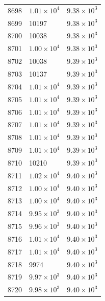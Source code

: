 \begin{table}[H]
\begin{tabular}{lll}
8698 & $\displaystyle 1.01 \times 10^{4}$ & $\displaystyle 9.38 \times 10^{3}$ \\
8699 & 10197 & $\displaystyle 9.38 \times 10^{3}$ \\
8700 & 10038 & $\displaystyle 9.38 \times 10^{3}$ \\
8701 & $\displaystyle 1.00 \times 10^{4}$ & $\displaystyle 9.38 \times 10^{3}$ \\
8702 & 10038 & $\displaystyle 9.39 \times 10^{3}$ \\
8703 & 10137 & $\displaystyle 9.39 \times 10^{3}$ \\
8704 & $\displaystyle 1.01 \times 10^{4}$ & $\displaystyle 9.39 \times 10^{3}$ \\
8705 & $\displaystyle 1.01 \times 10^{4}$ & $\displaystyle 9.39 \times 10^{3}$ \\
8706 & $\displaystyle 1.01 \times 10^{4}$ & $\displaystyle 9.39 \times 10^{3}$ \\
8707 & $\displaystyle 1.01 \times 10^{4}$ & $\displaystyle 9.39 \times 10^{3}$ \\
8708 & $\displaystyle 1.01 \times 10^{4}$ & $\displaystyle 9.39 \times 10^{3}$ \\
8709 & $\displaystyle 1.01 \times 10^{4}$ & $\displaystyle 9.39 \times 10^{3}$ \\
8710 & 10210 & $\displaystyle 9.39 \times 10^{3}$ \\
8711 & $\displaystyle 1.02 \times 10^{4}$ & $\displaystyle 9.40 \times 10^{3}$ \\
8712 & $\displaystyle 1.00 \times 10^{4}$ & $\displaystyle 9.40 \times 10^{3}$ \\
8713 & $\displaystyle 1.00 \times 10^{4}$ & $\displaystyle 9.40 \times 10^{3}$ \\
8714 & $\displaystyle 9.95 \times 10^{3}$ & $\displaystyle 9.40 \times 10^{3}$ \\
8715 & $\displaystyle 9.96 \times 10^{3}$ & $\displaystyle 9.40 \times 10^{3}$ \\
8716 & $\displaystyle 1.01 \times 10^{4}$ & $\displaystyle 9.40 \times 10^{3}$ \\
8717 & $\displaystyle 1.01 \times 10^{4}$ & $\displaystyle 9.40 \times 10^{3}$ \\
8718 & 9974 & $\displaystyle 9.40 \times 10^{3}$ \\
8719 & $\displaystyle 9.97 \times 10^{3}$ & $\displaystyle 9.40 \times 10^{3}$ \\
8720 & $\displaystyle 9.98 \times 10^{3}$ & $\displaystyle 9.40 \times 10^{3}$ \\

\end{tabular}
\end{table}
